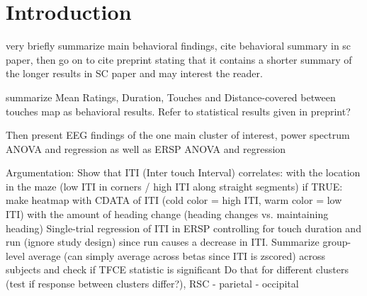 \section{Introduction}

very briefly summarize main behavioral findings, cite behavioral summary in sc paper, then go on to cite preprint stating that it contains a shorter summary of the longer results in SC paper and may interest the reader.

summarize Mean Ratings, Duration, Touches and Distance-covered between touches map as behavioral results. Refer to statistical results given in preprint?

Then present EEG findings of the one main cluster of interest, power spectrum ANOVA and regression as well as ERSP ANOVA and regression

Argumentation:
Show that ITI (Inter touch Interval) correlates:
with the location in the maze (low ITI in corners / high ITI along straight segments)
if TRUE: make heatmap with CDATA of ITI (cold color = high ITI, warm color = low ITI)
with the amount of heading change (heading changes vs. maintaining heading)
Single-trial regression of ITI in ERSP controlling for touch duration and run (ignore study design) since run causes a decrease in ITI.
Summarize group-level average (can simply average across betas since ITI is zscored) across subjects and check if TFCE statistic is significant
Do that for different clusters (test if response between clusters differ?), RSC - parietal - occipital


